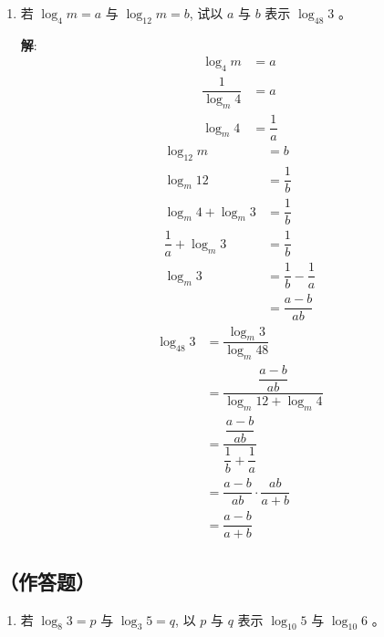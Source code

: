 \documentclass{report}
\newcommand{\sol}{\vspace{0.2cm}\textbf{解}:}
\begin{document}
\begin{multicols*}{2}
\begin{enumerate}[leftmargin=*]
        \item 若 $\log _4 m=a$ 与 $\log _{12} m=b$, 试以 $a$ 与 $b$ 表示 $\log _{48} 3$ 。

              \sol{}
              \begin{align*}
                  \log_4 m            & = a            \\
                  \dfrac{1}{\log_m 4} & = a            \\
                  \log_m 4            & = \dfrac{1}{a}
              \end{align*}
              \begin{align*}
                  \log_{12} m             & = b                           \\
                  \log_m 12               & = \dfrac{1}{b}                \\
                  \log_m 4 + \log_m 3     & = \dfrac{1}{b}                \\
                  \dfrac{1}{a} + \log_m 3 & = \dfrac{1}{b}                \\
                  \log_m 3                & = \dfrac{1}{b} - \dfrac{1}{a} \\
                                          & = \dfrac{a-b}{ab}
              \end{align*}
              \begin{align*}
                  \log_{48} 3 & = \dfrac{\log_m 3}{\log_m 48}                          \\
                              & = \dfrac{\dfrac{a-b}{ab}}{\log_m 12 + \log_m 4}        \\
                              & = \dfrac{\dfrac{a-b}{ab}}{\dfrac{1}{b} + \dfrac{1}{a}} \\
                              & = \dfrac{a-b}{ab} \cdot \dfrac{ab}{a+b}                \\
                              & = \dfrac{a-b}{a+b}
              \end{align*}
    \end{enumerate}

    \subsection*{（作答题）}

    \begin{enumerate}[leftmargin=*]
        \item 若 $\log _8 3=p$ 与 $\log _3 5=q$, 以 $p$ 与 $q$ 表示 $\log _{10} 5$ 与 $\log _{10} 6$ 。


\end{enumerate}
\end{multicols*}
\end{document}
